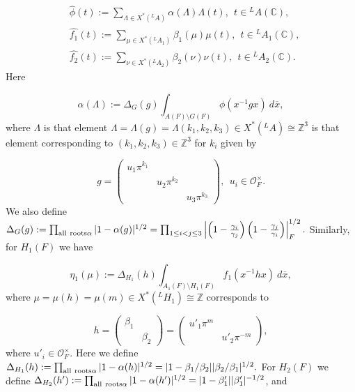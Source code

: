 \documentclass[12pt,letterpaper]{amsart}
\numberwithin{equation}{section}
\theoremstyle{definition}
\theoremstyle{plain}
\providecommand{\cal}{\mathcal}
\def\ccc{\mathbb{C}}
\def\zzz{\mathbb{Z}}
\def\off{{\cal O}_F}
\def\ovx{\overline{x}}
\begin{document}
\begin{equation}
\label{eqn:2.7}
\begin{split}
&\hat{\phi}(t) := \sum_{\Lambda \in X^*({^{L}A})} \alpha (\Lambda )\Lambda (t),
\ \ t\in {^{L}A}(\ccc ),\\
&\hat{f_1}(t) := \sum_{\mu \in X^*({^{L}A_1})} \beta_1(\mu )\mu (t),
\ \ t\in {^{L}A_1}(\ccc ),\\
&\hat{f_2}(t) := \sum_{\nu \in X^*({^{L}A_2})} \beta_2(\nu )\nu (t),
\ \ t\in {^{L}A_2}(\ccc ).
\end{split}
\end{equation}
Here

\begin{equation}
\label{eqn:2.8}
\alpha (\Lambda ):=\Delta_G (g)\int_{A(F)\setminus G(F)}
\phi (x^{-1}gx)\ d\ovx ,
\end{equation}
where $\Lambda$ is that element $\Lambda =\Lambda (g)
=\Lambda (k_1,k_2,k_3) \in X^*({^{L}A})
\cong \zzz^3$ is that element corresponding to $(k_1,k_2,k_3)\in \zzz^3$
for $k_i$ given by

\[
g = \left( \begin{array}{ccc} u_1\pi^{k_1}&\ &\ \\
\ &u_2\pi^{k_2}&\ \\
\ &\ &u_3\pi^{k_3}\end{array} \right) ,\ \ u_i\in \off^{\times}.
\]
We also define $\Delta_G(g)
:=\prod_{{\rm all\  roots }\alpha }|1-\alpha (g)|^{1/2}
=\prod_{1\leq i<j\leq 3}
\left|\left(1-\frac{\gamma_i}{\gamma_j}\right)
\left(1-\frac{\gamma_j}{\gamma_i}\right)\right|_F^{1/2}.$ Similarly, for $H_1(F)$ we have

\begin{equation}
\label{eqn:2.9}
\eta_1 (\mu ):=\Delta_{H_1} (h)\int_{A_1(F)\setminus H_1(F)}
f_1(x^{-1}hx)\ d\ovx ,
\end{equation}
where $\mu =\mu (h)= \mu (m) \in X^*({^{L}H_1})\cong \zzz$ corresponds to

\[
h = \left( \begin{array}{cc} \beta_1&\ \\ \ &\beta_2
\end{array}
\right)
= \left( 
\begin{array}{cc}
u'_1\pi^{m}&\ \\ 
\ &u'_2\pi^{-m}
\end{array}
\right),
\]
where $u'_i\in \off^{\times}$.
Here we define $\Delta_{H_1}(h)
:=\prod_{{\rm all\  roots }\alpha }|1-\alpha (h)|^{1/2}
=|1-\beta_1/\beta_2||\beta_2/\beta_1|^{1/2}.$
For $H_2(F)$ we define $\Delta_{H_2}(h')
:=\prod_{{\rm all\  roots }\alpha }|1-\alpha (h')|^{1/2}
=|1-\beta '_1||\beta '_1|^{-1/2}$, and
\end{document}
